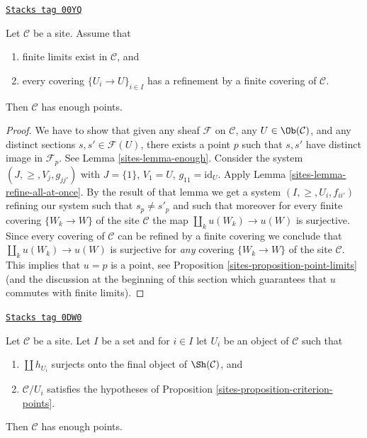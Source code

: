 \begin{proposition}
\label{sites-proposition-criterion-points}
\href{https://stacks.math.columbia.edu/tag/00YQ}{\texttt{Stacks tag 00YQ}}

\begin{reference}
\cite[Expos\'e VI, Appendix by Deligne, Proposition 9.0]{SGA4}
\end{reference}
Let $\mathcal{C}$ be a site. Assume that
\begin{enumerate}
\item finite limits exist in $\mathcal{C}$, and
\item every covering $\{U_i \to U\}_{i \in I}$
has a refinement by a finite covering of $\mathcal{C}$.
\end{enumerate}
Then $\mathcal{C}$ has enough points.
\end{proposition}

\begin{proof}

We have to show that given any sheaf
$\mathcal{F}$ on $\mathcal{C}$, any $U \in \Ob(\mathcal{C})$,
and any distinct sections $s, s' \in \mathcal{F}(U)$, there exists
a point $p$ such that $s, s'$ have distinct image in
$\mathcal{F}_p$. See Lemma \ref{sites-lemma-enough}.
Consider the system $(J, \geq, V_j, g_{jj'})$
with $J = \{1\}$, $V_1 = U$, $g_{11} = \text{id}_U$.
Apply Lemma \ref{sites-lemma-refine-all-at-once}.
By the result of that lemma we get a system
$(I, \geq, U_i, f_{ii'})$ refining our system such
that $s_p \not = s'_p$ and such that moreover for every
finite covering $\{W_k \to W\}$ of the site $\mathcal{C}$ the map
$\coprod_k u(W_k) \to u(W)$ is surjective.
Since every covering of $\mathcal{C}$ can be refined by
a finite covering we conclude that
$\coprod_k u(W_k) \to u(W)$ is surjective for {\it any}
covering $\{W_k \to W\}$ of the site $\mathcal{C}$.
This implies that $u = p$ is a point, see
Proposition \ref{sites-proposition-point-limits} (and the discussion
at the beginning of this section which guarantees that $u$
commutes with finite limits).
\end{proof}

\begin{lemma}
\label{sites-lemma-criterion-points}
\href{https://stacks.math.columbia.edu/tag/0DW0}{\texttt{Stacks tag 0DW0}}

Let $\mathcal{C}$ be a site. Let $I$ be a set and for
$i \in I$ let $U_i$ be an object of $\mathcal{C}$ such that
\begin{enumerate}
\item $\coprod h_{U_i}$ surjects onto
the final object of $\Sh(\mathcal{C})$, and
\item $\mathcal{C}/U_i$ satisfies the hypotheses of
Proposition \ref{sites-proposition-criterion-points}.
\end{enumerate}
Then $\mathcal{C}$ has enough points.
\end{lemma}

